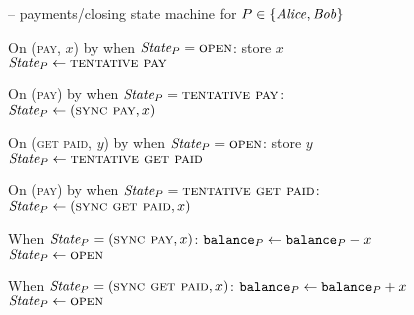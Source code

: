 \begin{figure}[H]
  \begin{systembox}{\fchan{} -- payments/closing state machine for $P \in
  \{\mathit{Alice}, \mathit{Bob}\}$}
    \begin{algorithmic}[1]
      \State On (\textsc{pay}, $x$) by \environment when $\itistate_P =
      \textsc{open}$: 
      \label{code:functionality:pay-close:when-tent-pay}
      \Indent
        \State store $x$
        \State $\itistate_P \gets \textsc{tentative pay}$
      \EndIndent
      \Statex

      \State On (\textsc{pay}) by \adversary when $\itistate_P =
      \textsc{tentative pay}$: 
      \label{code:functionality:pay-close:when-sync-pay}
      \Indent
        \State $\itistate_P \gets (\textsc{sync pay}, x)$
      \EndIndent
      \Statex

      \State On (\textsc{get paid}, $y$) by \environment when $\itistate_P =
      \textsc{open}$: 
      \label{code:functionality:pay-close:when-tent-get-paid}
      \Indent
        \State store $y$
        \State $\itistate_P \gets \textsc{tentative get paid}$
      \EndIndent
      \Statex

      \State On (\textsc{pay}) by \adversary when $\itistate_P =
      \textsc{tentative get paid}$: 
      \label{code:functionality:pay-close:when-sync-get-paid}
      \Indent
        \State $\itistate_P \gets (\textsc{sync get paid}, x)$
      \EndIndent
      \Statex

      \State When $\itistate_P = (\textsc{sync pay}, x)$:
      \Indent
          \State $\texttt{balance}_{P} \gets \texttt{balance}_{P} - x$
          \State {}
          \State $\itistate_P \gets \textsc{open}$
          \label{code:functionality:pay-close:pay-end}
        \EndIf
      \EndIndent
      \Statex

      \State When $\itistate_P = (\textsc{sync get paid}, x)$:
      \Indent
          \State $\texttt{balance}_{P} \gets \texttt{balance}_{P} + x$
          \State {}
          \State $\itistate_P \gets \textsc{open}$
          \label{code:functionality:pay-close:get-paid-end}
        \EndIf
      \EndIndent
      \Statex


\end{algorithmic}
\end{systembox}
\end{figure}
